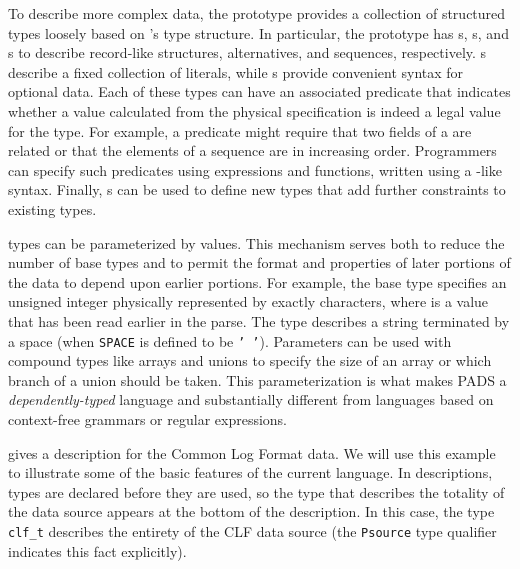 \documentclass[10pt]{article}
\begin{document}
To describe more complex data, the prototype provides a collection of
structured types loosely based on \C{}'s type structure.  In
particular, the prototype has s, s, and s
to describe record-like structures, alternatives, and sequences,
respectively.  s describe a fixed collection of literals,
while s provide convenient syntax for optional data.  Each of
these types can have an associated predicate that indicates whether a
value calculated from the physical specification is indeed a legal
value for the type.  For example, a predicate might require that two
fields of a  are related or that the elements of a
sequence are in increasing order.  Programmers can specify such
predicates using \pads{} expressions and functions, written using a
\C{}-like syntax.  Finally, \pads{} s can be used to
define new types that add further constraints to existing types.

\pads{} types can be parameterized by values.  This mechanism serves
both to reduce the number of base types and to permit the format and
properties of later portions of the data to depend upon earlier
portions.  For example, the base type  specifies
an unsigned integer physically represented by exactly 
characters, where  is a value that has been read earlier in the
parse.  The type  describes a string
terminated by a space (when \texttt{SPACE} is defined to be \texttt{' '}).  
Parameters can be used with compound types like arrays and unions to
specify the size of an array or which branch of a union should be
taken.  This parameterization is what makes PADS a {\em dependently-typed}
language and substantially different from languages based on
context-free grammars or regular expressions.

 gives a \pads{} description for the Common Log Format
data.  
We will use this example to illustrate some of the basic
features of the current \pads{} language.  
In \pads{} descriptions, types are declared before they are used, 
so the type that describes the totality of the data source appears 
at the bottom of the description.  
In this case,
the type \texttt{clf\_t}  describes the entirety of the
CLF data source (the \texttt{Psource} type qualifier indicates
this fact explicitly).  
\end{document}
